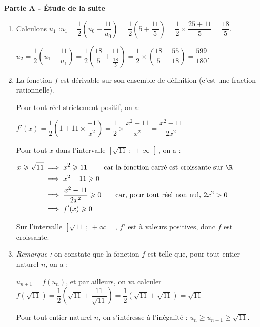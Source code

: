 
\medskip

\textbf{Partie A - Étude de la suite }

\medskip

\begin{enumerate}
\item Calculons $u_{1}$ :\quad $u_1 = \dfrac{1}{2}\left(u_0 + \dfrac{11}{u_0}\right) = \dfrac{1}{2}\left(5 + \dfrac{11}{5}\right) = \dfrac{1}{2}\times \dfrac{25 + 11}{5} = \dfrac{18}{5}$.

 $u_2 = \dfrac{1}{2}\left(u_1 + \dfrac{11}{u_1}\right) = \dfrac{1}{2}\left(\dfrac{18}{5} + \dfrac{11}{\frac{18}{5}}\right) = \dfrac{1}{2}\times \left(\dfrac{18}{5}+\dfrac{55}{18}\right)  = \dfrac{599}{180}$.

\item La fonction $f$ est dérivable sur son ensemble de définition (c'est une fraction rationnelle).

Pour tout réel strictement positif, on a:

$f'(x) = \dfrac{1}{2}\left(1 + 11\times \dfrac{-1}{x^2}\right) = \dfrac{1}{2}\times \dfrac{x^2 - 11}{x^2} = \dfrac{x^2-11}{2x^2}$

Pour tout $x$ dans l'intervalle $\left[\sqrt{11} ~;~+\infty\right[$, on a :

$\aligned x \geqslant \sqrt{11} &\implies x^2 \geqslant 11 \qquad\text{ car la fonction carré est croissante sur }\R^+\\
&\implies x^2 - 11 \geqslant 0\\
&\implies \dfrac{x^2-11}{2x^2} \geqslant 0 \qquad \text{car, pour tout réel non nul, } 2x^2>0 \\
&\implies f'(x) \geqslant 0\\ \endaligned$

Sur l'intervalle $\left[\sqrt{11} ~;~+\infty\right[$, $f'$ est à valeurs positives, donc $f$ est croissante.

\item \emph{Remarque :} on constate que la fonction $f$ est telle que, pour tout entier naturel $n$, on a :

$u_{n+1} = f(u_n)$, et par ailleurs, on va calculer $f\left(\sqrt{11}\right) = \dfrac{1}{2}\left(\sqrt{11} + \dfrac{11}{\sqrt{11}}\right)  = \dfrac{1}{2}\left(\sqrt{11} + \sqrt{11}\right) = \sqrt{11}$

Pour tout entier naturel $n$, on s'intéresse à l'inégalité : $ u_{n} \geqslant u_{n+1} \geqslant \sqrt{11}$.


\end{enumerate}
